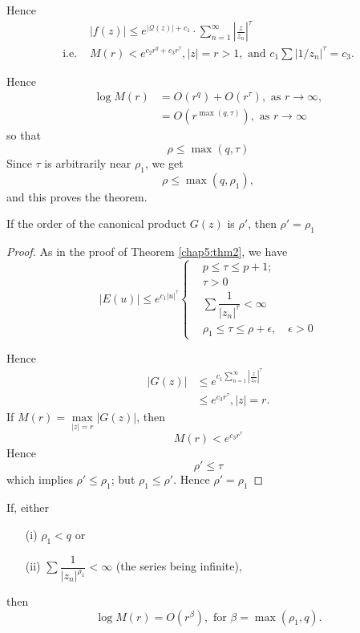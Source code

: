 \begin{thm}
Hence\pageoriginale
\begin{align*}
& |f(z)| \leq e^{|\mathcal{Q}(z)|+c_1} \cdot \sum\limits^\infty_{n=1}
  \left|\frac{z}{z_n} \right|^\tau\\
\text{i.e. } & M(r) < e^{c_2 r^q + c_3 r^\tau}, |z| = r > 1,
\text{ and } c_1 \sum |1/z_n|^\tau = c_3.
\end{align*}

\eject

Hence
\begin{align*}
\log M(r) & = O(r^q) + O(r^\tau), \text{ as } r \to \infty,\\
& = O(r^{\max (q,\tau)}), \text{ as } r \to \infty \tag{2.1}\label{c5:eq2.1}
\end{align*}
so that
$$
\rho \leq \max (q, \tau)
$$
Since $\tau$ is arbitrarily near $\rho_1$, we get
$$
\rho \leq \max (q, \rho_1),
$$
and this proves the theorem.
\end{thm}

\begin{thm}\label{chap5:thm3}
If the order of the canonical product $G(z)$ is $\rho'$, then
$\rho'=\rho_1$
\end{thm}

\begin{proof}
As in the proof of Theorem \ref{chap5:thm2}, we have
$$
|E(u)| \leq e^{c_1|u|^\tau}
\begin{cases}
& p \leq \tau \leq  p+1;\\
& \tau > 0\\
& \sum \dfrac{1}{|z_n|^\tau} < \infty\\
& \rho_1 \leq \tau \leq \rho + \epsilon, \quad \epsilon > 0
\end{cases}
$$

Hence
\begin{align*}
|G(z)| & \leq e^{c_1 \sum\limits^\infty_{n=1} \left| \frac{z}{z_n}\right|^\tau} \\
& \leq e^{c_3 r^\tau}, |z| = r.
\end{align*}
If $M(r) = \max\limits_{|z|=r} |G(z)|$\pageoriginale, then
$$
M(r) < e^{c_3 r^\tau}
$$
Hence
$$
\rho' \leq \tau
$$
which implies $\rho'\leq \rho_1$; but $\rho_1 \leq \rho'$. Hence
$\rho' = \rho_1$
\end{proof}

\begin{thm}\label{chap5:thm4}
If, either 
\begin{itemize}
\item[{\rm (i)}] $\rho_1 < q$  or 

\item[{\rm (ii)}] $\sum \dfrac{1}{|z_n|^{\rho_1}} < \infty$ (the
  series being infinite),
\end{itemize}
then
$$
\log M(r) = O (r^\beta), \text{ for }  \beta = \max (\rho_1, q). 
$$
\end{thm}


